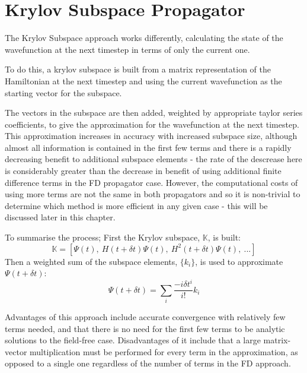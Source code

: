 \section{Krylov Subspace Propagator}
The Krylov Subspace approach works differently, calculating the state of the wavefunction at the next timestep in terms of only the current one. 

To do this, a krylov subspace is built from a matrix representation of the Hamiltonian at the next timestep and using the current wavefunction as the starting vector for the subspace. 

The vectors in the subspace are then added, weighted by appropriate taylor series coefficients, to give the approximation for the wavefunction at the next timestep. This approximation increases in accuracy with increased subspace size, although almost all information is contained in the first few terms and there is a rapidly decreasing benefit to additional subspace elements - the rate of the descrease here is considerably greater than the decrease in benefit of using additional finite difference terms in the FD propagator case. However, the computational costs of using more terms are not the same in both propagators and so it is non-trivial to determine which method is more efficient in any given case - this will be discussed later in this chapter.

To summarise the process;
First the Krylov subspace, $\mathbb{K}$, is built:
$$
\mathbb{K} = \left[\Psi\left(t\right) ,\ H\left(t+\delta{t}\right)\Psi\left(t\right) ,\ H^{2}\left(t+\delta{t}\right)\Psi\left(t\right) ,\ ... \right]
$$
Then a weighted sum of the subspace elements, $\{k_{i}\}$, is used to approximate $\Psi\left(t+\delta{t}\right)$:
$$
\Psi\left(t+\delta{t}\right) = \sum_{i}{\frac{-i\delta{t}^{i}}{i!}k_{i}}
$$

Advantages of this approach include accurate convergence with relatively few terms needed, and that there is no need for the first few terms to be analytic solutions to the field-free case.
Disadvantages of it include that a large matrix-vector multiplication must be performed for every term in the approximation, as opposed to a single one regardless of the number of terms in the FD approach.

